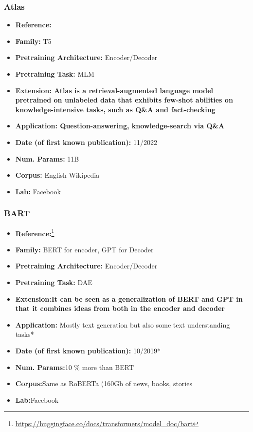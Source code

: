 \documentclass{article}
\begin{document}
\subsubsection{Atlas}
            \begin{itemize}
                \item \textbf{Reference:}\cite{izacard2022few}
                \item \textbf{Family:} T5
                \item \textbf{Pretraining Architecture:} Encoder/Decoder
                \item \textbf{Pretraining Task:} MLM
                \item \textbf{Extension: Atlas is a retrieval-augmented language model pretrained on unlabeled data that exhibits few-shot abilities on knowledge-intensive tasks, such as Q&A and fact-checking}
                \item \textbf{Application: Question-answering, knowledge-search via Q&A}
                \item \textbf{Date (of first known publication):} 11/2022
                \item \textbf{Num. Params:} 11B
                \item \textbf{Corpus:} English Wikipedia
                \item \textbf{Lab:} Facebook
            \end{itemize}

\subsubsection{BART}
            \begin{itemize}
                \item \textbf{Reference:}\footnote{\url{https://huggingface.co/docs/transformers/model_doc/bart}}\cite{lewis2019bart}
                \item \textbf{Family:} BERT for encoder, GPT for Decoder 
                \item \textbf{Pretraining Architecture:} Encoder/Decoder
                \item \textbf{Pretraining Task:} DAE
                \item \textbf{Extension:It can be seen as a generalization of BERT and GPT in that it combines ideas from both in the encoder and decoder}   
                \item \textbf{Application:} Mostly text generation but also some text understanding tasks*
                \item \textbf{Date (of first known publication):} 10/2019*
                \item \textbf{Num. Params:}10 \% more than BERT
                \item \textbf{Corpus:}Same as RoBERTa (160Gb of news, books, stories
                \item \textbf{Lab:}Facebook
            \end{itemize}
\end{document}
